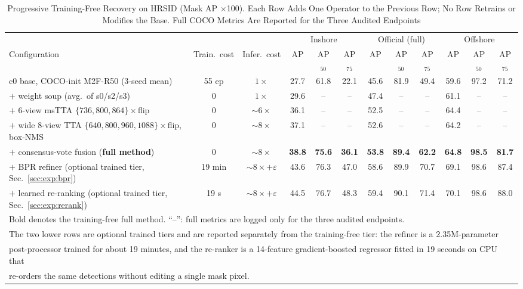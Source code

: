 \begin{table}[!t]
\caption{Progressive Training-Free Recovery on HRSID (Mask AP $\times$100). Each Row Adds One Operator to the Previous Row; No Row Retrains or Modifies the Base. Full COCO Metrics Are Reported for the Three Audited Endpoints}
\label{tab:main}
\centering
\footnotesize
\setlength{\tabcolsep}{4pt}
\begin{tabular}{lccccccccccc}
\toprule
& & & \multicolumn{3}{c}{Inshore} & \multicolumn{3}{c}{Official (full)} & \multicolumn{3}{c}{Offshore} \\
\cmidrule(lr){4-6}\cmidrule(lr){7-9}\cmidrule(lr){10-12}
Configuration & Train.\ cost & Infer.\ cost & AP & AP$_{50}$ & AP$_{75}$ & AP & AP$_{50}$ & AP$_{75}$ & AP & AP$_{50}$ & AP$_{75}$ \\
\midrule
c0 base, COCO-init M2F-R50 (3-seed mean) & 55 ep & $1\times$ & 27.7 & 61.8 & 22.1 & 45.6 & 81.9 & 49.4 & 59.6 & 97.2 & 71.2 \\
$+$ weight soup (avg.\ of s0/s2/s3) & 0 & $1\times$ & 29.6 & -- & -- & 47.4 & -- & -- & 61.1 & -- & -- \\
$+$ 6-view msTTA $\{736,800,864\}\times$flip & 0 & $\sim6\times$ & 36.1 & -- & -- & 52.5 & -- & -- & 64.4 & -- & -- \\
$+$ wide 8-view TTA $\{640,800,960,1088\}\times$flip, box-NMS & 0 & $\sim8\times$ & 37.1 & -- & -- & 52.6 & -- & -- & 64.2 & -- & -- \\
$+$ consensus-vote fusion (\textbf{full method}) & 0 & $\sim8\times$ & \textbf{38.8} & \textbf{75.6} & \textbf{36.1} & \textbf{53.8} & \textbf{89.4} & \textbf{62.2} & \textbf{64.8} & \textbf{98.5} & \textbf{81.7} \\
\midrule
$+$ BPR refiner (optional trained tier, Sec.~\ref{sec:exp:bpr}) & 19 min & $\sim8\times+\varepsilon$ & 43.6 & 76.3 & 47.0 & 58.6 & 89.9 & 70.7 & 69.1 & 98.6 & 87.4 \\
$+$ learned re-ranking (optional trained tier, Sec.~\ref{sec:exp:rerank}) & 19 s & $\sim8\times+\varepsilon$ & 44.5 & 76.7 & 48.3 & 59.4 & 90.1 & 71.4 & 70.1 & 98.6 & 88.0 \\
\bottomrule
\multicolumn{12}{l}{\footnotesize Bold denotes the training-free full method. ``--'': full metrics are logged only for the three audited endpoints.} \\
\multicolumn{12}{l}{\footnotesize The two lower rows are optional trained tiers and are reported separately from the training-free tier: the refiner is a 2.35M-parameter} \\
\multicolumn{12}{l}{\footnotesize post-processor trained for about 19 minutes, and the re-ranker is a 14-feature gradient-boosted regressor fitted in 19 seconds on CPU that} \\
\multicolumn{12}{l}{\footnotesize re-orders the same detections without editing a single mask pixel.}
\end{tabular}
\end{table}

